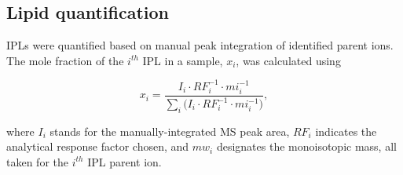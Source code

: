 \subsection{Lipid quantification} IPLs were quantified based on manual peak integration of identified parent ions. The mole fraction of the $i^{th}$ IPL in a sample, $x_{i}$, was calculated using

\begin{equation} \label{eq:IPLquant}
x_{i} = \frac{I_{i} \cdot RF_{i}^{-1} \cdot mi_{i}^{-1}}{\sum_{i} \big(I_{i} \cdot RF_{i}^{-1} \cdot mi_{i}^{-1}\big)},
\end{equation}
 
\noindent where $I_{i}$ stands for the manually-integrated MS peak area, $RF_{i}$ indicates the analytical response factor chosen, and $mw_{i}$ designates the monoisotopic mass, all taken for the $i^{th}$ IPL parent ion.

